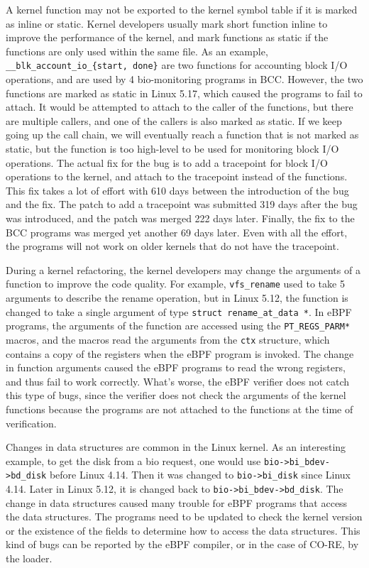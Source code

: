 A kernel function may not be exported to the kernel symbol table if it is marked as inline or static.
Kernel developers usually mark short function inline to improve the performance of the kernel, and mark functions as static if the functions are only used within the same file. 
As an example, \texttt{\_\_blk\_account\_io\_\{start, done\}} are two functions for accounting block I/O operations, and are used by 4 bio-monitoring programs in BCC. However, the two functions are marked as static in Linux 5.17, which caused the programs to fail to attach.
It would be attempted to attach to the caller of the functions, but there are multiple callers, and one of the callers is also marked as static.
If we keep going up the call chain, we will eventually reach a function that is not marked as static, but the function is too high-level to be used for monitoring block I/O operations.
The actual fix for the bug is to add a tracepoint for block I/O operations to the kernel, and attach to the tracepoint instead of the functions.
This fix takes a lot of effort with 610 days between the introduction of the bug and the fix. 
The patch to add a tracepoint was submitted 319 days after the bug was introduced, and the patch was merged 222 days later. Finally, the fix to the BCC programs was merged yet another 69 days later.
Even with all the effort, the programs will not work on older kernels that do not have the tracepoint.

During a kernel refactoring, the kernel developers may change the arguments of a function to improve the code quality.
For example, \texttt{vfs\_rename} used to take 5 arguments to describe the rename operation, but in Linux 5.12, the function is changed to take a single argument of type \texttt{struct rename\_at\_data *}. 
In eBPF programs, the arguments of the function are accessed using the \texttt{PT\_REGS\_PARM*} macros, and the macros read the arguments from the \texttt{ctx} structure, which contains a copy of the registers when the eBPF program is invoked.
The change in function arguments caused the eBPF programs to read the wrong registers, and thus fail to work correctly.
What's worse, the eBPF verifier does not catch this type of bugs, since the verifier does not check the arguments of the kernel functions because the programs are not attached to the functions at the time of verification.

Changes in data structures are common in the Linux kernel.
As an interesting example, to get the disk from a bio request, one would use \texttt{bio->bi\_bdev->bd\_disk} before Linux 4.14. Then it was changed to \texttt{bio->bi\_disk} since Linux 4.14. Later in Linux 5.12, it is changed back to \texttt{bio->bi\_bdev->bd\_disk}. 
The change in data structures caused many trouble for eBPF programs that access the data structures.
The programs need to be updated to check the kernel version or the existence of the fields to determine how to access the data structures.
This kind of bugs can be reported by the eBPF compiler, or in the case of CO-RE, by the loader. 


